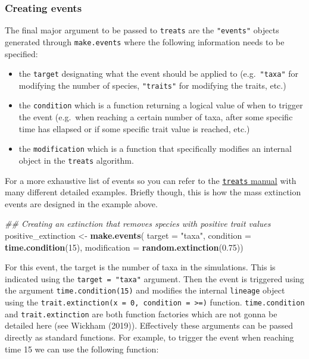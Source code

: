 \documentclass[
]{article}
\newenvironment{Shaded}{\begin{snugshade}}{\end{snugshade}}
\newcommand{\CommentTok}[1]{\textcolor[rgb]{0.56,0.35,0.01}{\textit{#1}}}
\newcommand{\DataTypeTok}[1]{\textcolor[rgb]{0.13,0.29,0.53}{#1}}
\newcommand{\DecValTok}[1]{\textcolor[rgb]{0.00,0.00,0.81}{#1}}
\newcommand{\FloatTok}[1]{\textcolor[rgb]{0.00,0.00,0.81}{#1}}
\newcommand{\KeywordTok}[1]{\textcolor[rgb]{0.13,0.29,0.53}{\textbf{#1}}}
\newcommand{\NormalTok}[1]{#1}
\newcommand{\StringTok}[1]{\textcolor[rgb]{0.31,0.60,0.02}{#1}}
\providecommand{\tightlist}{%
  \setlength{\itemsep}{0pt}\setlength{\parskip}{0pt}}
\begin{document}
\hypertarget{creating-events}{%
\subsubsection{Creating events}\label{creating-events}}

The final major argument to be passed to \texttt{treats} are the
\texttt{"events"} objects generated through \texttt{make.events} where
the following information needs to be specified:

\begin{itemize}
\tightlist
\item
  the \texttt{target} designating what the event should be applied to
  (e.g.~\texttt{"taxa"} for modifying the number of species,
  \texttt{"traits"} for modifying the traits, etc.)
\item
  the \texttt{condition} which is a function returning a logical value
  of when to trigger the event (e.g.~when reaching a certain number of
  taxa, after some specific time has ellapsed or if some specific trait
  value is reached, etc.)
\item
  the \texttt{modification} which is a function that specifically
  modifies an internal object in the \texttt{treats} algorithm.
\end{itemize}

For a more exhaustive list of events so you can refer to the
\href{http://tguillerme.github.io/treats.html}{\texttt{treats} manual}
with many different detailed examples. Briefly though, this is how the
mass extinction events are designed in the example above.

\begin{Shaded}
\begin{Highlighting}[]
\CommentTok{\#\# Creating an extinction that removes species with positive trait values}
\NormalTok{positive\_extinction \textless{}{-}}\StringTok{ }\KeywordTok{make.events}\NormalTok{(}
    \DataTypeTok{target       =} \StringTok{"taxa"}\NormalTok{,}
    \DataTypeTok{condition    =} \KeywordTok{time.condition}\NormalTok{(}\DecValTok{15}\NormalTok{),}
    \DataTypeTok{modification =} \KeywordTok{random.extinction}\NormalTok{(}\FloatTok{0.75}\NormalTok{))}
\end{Highlighting}
\end{Shaded}

For this event, the target is the number of taxa in the simulations.
This is indicated using the \texttt{target\ =\ "taxa"} argument. Then
the event is triggered using the argument \texttt{time.condition(15)}
and modifies the internal \texttt{lineage} object using the
\texttt{trait.extinction(x\ =\ 0,\ condition\ =\ \textasciigrave{}\textgreater{}=\textasciigrave{})}
function. \texttt{time.condition} and \texttt{trait.extinction} are both
function factories which are not gonna be detailed here (see Wickham
(2019)). Effectively these arguments can be passed directly as standard
functions. For example, to trigger the event when reaching time 15 we
can use the following function:
\end{document}
